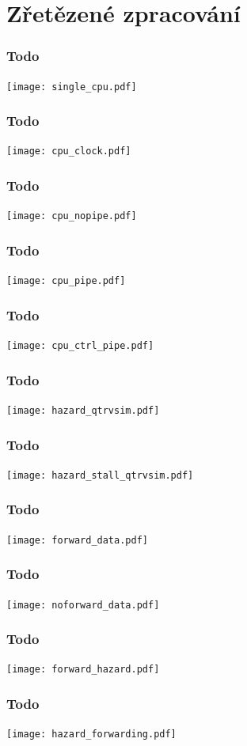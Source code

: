 \documentclass{beamer}
\subtitle{Lekce 05. Zřetězené zpracování\\Pipelining}
\author{Pavel Píša \phantom{xxxxxxx} Petr Štěpán \\ \small\texttt{pisa@fel.cvut.cz}\phantom{xxxx}\small\texttt{stepan@fel.cvut.cz}}
\begin{document}
\maketitle

\section{Zřetězené zpracování}

\begin{frame}
\frametitle{Todo}
\texttt{[image: single\_cpu.pdf]}
\end{frame}

\begin{frame}
\frametitle{Todo}
\texttt{[image: cpu\_clock.pdf]}
\end{frame}

\begin{frame}
\frametitle{Todo}
\texttt{[image: cpu\_nopipe.pdf]}
\end{frame}

\begin{frame}
\frametitle{Todo}
\texttt{[image: cpu\_pipe.pdf]}
\end{frame}

\begin{frame}
\frametitle{Todo}
\texttt{[image: cpu\_ctrl\_pipe.pdf]}
\end{frame}

\begin{frame}
\frametitle{Todo}
\texttt{[image: hazard\_qtrvsim.pdf]}
\end{frame}

\begin{frame}
\frametitle{Todo}
\texttt{[image: hazard\_stall\_qtrvsim.pdf]}
\end{frame}


\begin{frame}
\frametitle{Todo}
\texttt{[image: forward\_data.pdf]}
\end{frame}

\begin{frame}
\frametitle{Todo}
\texttt{[image: noforward\_data.pdf]}
\end{frame}

\begin{frame}
\frametitle{Todo}
\texttt{[image: forward\_hazard.pdf]}
\end{frame}

\begin{frame}
\frametitle{Todo}
\texttt{[image: hazard\_forwarding.pdf]}
\end{frame}
\end{document}
